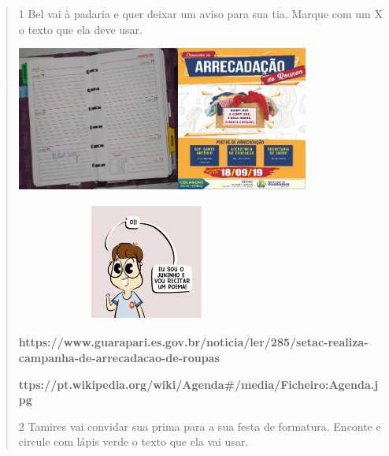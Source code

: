 {{{{\begin{verse}
{{\num{1} Bel vai à padaria e quer deixar um aviso para sua tia. 
Marque com um X o texto que ela deve usar.


\includegraphics[width=2.10625in,height=1.86042in]{media/image93.jpeg}\includegraphics[width=1.68611in,height=1.86042in]{media/image94.jpeg}

\includegraphics[width=3.36528in,height=1.53611in]{media/image97.png}

\textbf{https://www.guarapari.es.gov.br/noticia/ler/285/setac-realiza-campanha-de-arrecadacao-de-roupas}

\textbf{ttps://pt.wikipedia.org/wiki/Agenda\#/media/Ficheiro:Agenda.jpg}

\num{2} Tamires vai convidar sua prima para a sua festa de formatura. 
Enconte e circule com lápis verde o texto que ela vai usar. 


}}
\end{verse}}}}}
